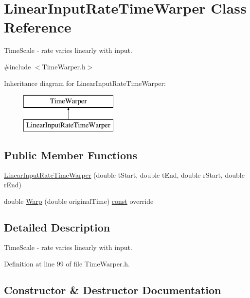 \hypertarget{class_linear_input_rate_time_warper}{}\section{Linear\+Input\+Rate\+Time\+Warper Class Reference}
\label{class_linear_input_rate_time_warper}


Time\+Scale -\/ rate varies linearly with input.  




{\ttfamily \#include $<$Time\+Warper.\+h$>$}

Inheritance diagram for Linear\+Input\+Rate\+Time\+Warper\+:\begin{figure}[H]
\begin{center}
\leavevmode
\includegraphics[height=2.000000cm]{class_linear_input_rate_time_warper}
\end{center}
\end{figure}
\subsection*{Public Member Functions}
\begin{DoxyCompactItemize}
\item 
\hyperlink{class_linear_input_rate_time_warper_a847089a0e0ac0e7c8ed5daa86e80b96d}{Linear\+Input\+Rate\+Time\+Warper} (double t\+Start, double t\+End, double r\+Start, double r\+End)
\item 
double \hyperlink{class_linear_input_rate_time_warper_ac1077d12f93ed8925b9920009d45fe9b}{Warp} (double original\+Time) \hyperlink{getopt1_8c_a2c212835823e3c54a8ab6d95c652660e}{const}  override
\end{DoxyCompactItemize}


\subsection{Detailed Description}
Time\+Scale -\/ rate varies linearly with input. 

Definition at line 99 of file Time\+Warper.\+h.



\subsection{Constructor \& Destructor Documentation}
